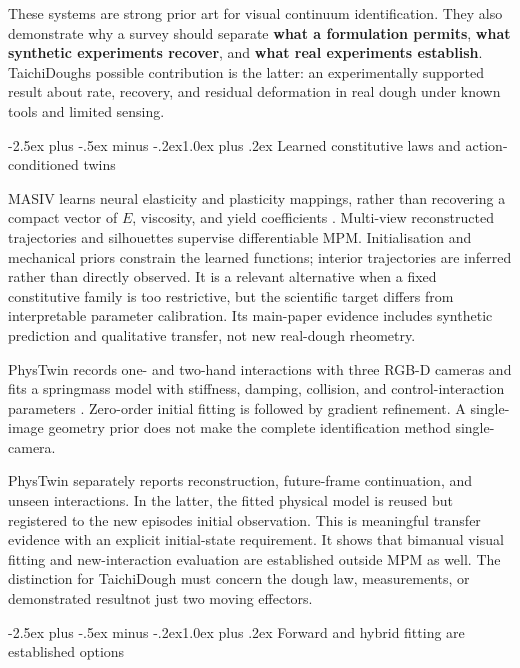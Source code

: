 \documentclass[
  11pt,
]{article}
\makeatletter
\renewcommand\subsection{\needspace{5\baselineskip}\@startsection{subsection}{2}{\z@}%
  {-2.5ex plus -.5ex minus -.2ex}{1.0ex plus .2ex}%
  {\normalfont\sffamily\large\bfseries\color{accent}}}
\makeatother
\begin{document}
These systems are strong prior art for visual continuum identification.
They also demonstrate why a survey should separate \textbf{what a
formulation permits}, \textbf{what synthetic experiments recover}, and
\textbf{what real experiments establish}. TaichiDough\textquotesingle s
possible contribution is the latter: an experimentally supported result
about rate, recovery, and residual deformation in real dough under known
tools and limited sensing.

\subsection{Learned constitutive laws and action-conditioned
twins}\label{learned-constitutive-laws-and-action-conditioned-twins}

MASIV learns neural elasticity and plasticity mappings, rather than
recovering a compact vector of \(E\), viscosity, and yield coefficients
. Multi-view reconstructed
trajectories and silhouettes supervise differentiable MPM.
Initialisation and mechanical priors constrain the learned functions;
interior trajectories are inferred rather than directly observed. It is
a relevant alternative when a fixed constitutive family is too
restrictive, but the scientific target differs from interpretable
parameter calibration. Its main-paper evidence includes synthetic
prediction and qualitative transfer, not new real-dough rheometry.

PhysTwin records one- and two-hand interactions with three RGB-D cameras
and fits a spring\textendash{}\allowbreak{}mass model with stiffness,
damping, collision, and control-interaction parameters
. Zero-order initial fitting is
followed by gradient refinement. A single-image geometry prior does not
make the complete identification method single-camera.

PhysTwin separately reports reconstruction, future-frame continuation,
and unseen interactions. In the latter, the fitted physical model is
reused but registered to the new episode\textquotesingle s initial
observation. This is meaningful transfer evidence with an explicit
initial-state requirement. It shows that bimanual visual fitting and
new-interaction evaluation are established outside MPM as well. The
distinction for TaichiDough must concern the dough law, measurements, or
demonstrated result\textemdash{}\allowbreak{}not just two moving
effectors.

\subsection{Forward and hybrid fitting are established
options}\label{forward-and-hybrid-fitting-are-established-options}
\end{document}
